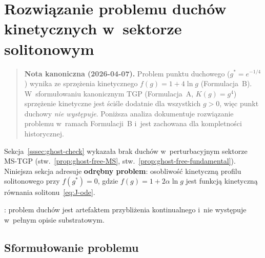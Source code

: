 \section{Rozwiązanie problemu duchów kinetycznych
  w~sektorze solitonowym}\label{sec:ghost-resolution}

\begin{quote}
\textbf{Nota kanoniczna (2026-04-07).}
Problem punktu duchowego ($g^* = e^{-1/4}$) wynika ze sprzężenia
kinetycznego $f(g) = 1 + 4\ln g$ (Formulacja~B).
W~sformułowaniu kanonicznym TGP (Formulacja~A, $K(g) = g^4$)
sprzężenie kinetyczne jest ściśle dodatnie dla wszystkich $g > 0$,
więc punkt duchowy \emph{nie występuje}.
Poniższa analiza dokumentuje rozwiązanie problemu w~ramach
Formulacji~B i~jest zachowana dla kompletności historycznej.
\end{quote}

Sekcja~\ref{sssec:ghost-check} wykazała brak duchów
w~perturbacyjnym sektorze MS-TGP
(stw.~\ref{prop:ghost-free-MS}, stw.~\ref{prop:ghost-free-fundamental}).
Niniejsza sekcja adresuje \textbf{odrębny problem}: osobliwość
kinetyczną profilu solitonowego przy $f(g^*) = 0$, gdzie
$f(g) = 1 + 2\alpha\ln g$ jest funkcją kinetyczną
równania solitonu~\eqref{eq:J-ode}.

: problem duchów jest artefaktem
przybliżenia kontinualnego i~nie występuje
w~pełnym opisie substratowym.

\subsection{Sformułowanie problemu}\label{ssec:ghost-problem}

